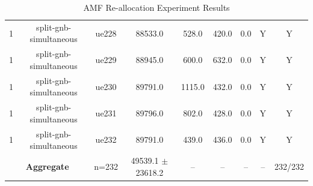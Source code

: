 \begin{table}[ht]
\begin{tabular}{|c|c|c|c|c|c|c|c|c|}
1 & split-gnb-simultaneous & ue228 & 88533.0 & 528.0 & 420.0 & 0.0 & Y & Y \\
1 & split-gnb-simultaneous & ue229 & 88945.0 & 600.0 & 632.0 & 0.0 & Y & Y \\
1 & split-gnb-simultaneous & ue230 & 89791.0 & 1115.0 & 432.0 & 0.0 & Y & Y \\
1 & split-gnb-simultaneous & ue231 & 89796.0 & 802.0 & 428.0 & 0.0 & Y & Y \\
1 & split-gnb-simultaneous & ue232 & 89791.0 & 439.0 & 436.0 & 0.0 & Y & Y \\
\multicolumn{2}{|c|}{\textbf{Aggregate}} & n=232 & 49539.1 $\pm$ 23618.2 & -- & -- & -- & -- & 232/232 \\
\hline
\end{tabular}
\caption{AMF Re-allocation Experiment Results}
\label{tab:amf_realloc}
\end{table}
